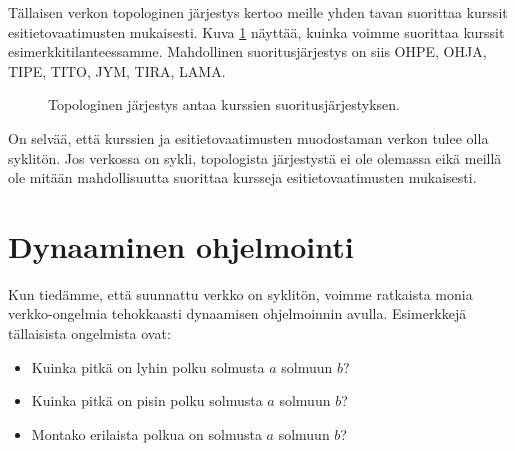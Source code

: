 Tällaisen verkon topologinen järjestys kertoo meille
yhden tavan suorittaa kurssit esitietovaatimusten mukaisesti.
Kuva \ref{fig:kurjar} näyttää, kuinka voimme suorittaa
kurssit esimerkkitilanteessamme.
Mahdollinen suoritusjärjestys on siis
OHPE, OHJA, TIPE, TITO, JYM, TIRA, LAMA.

\begin{figure}
\center
\begin{center}
\end{center}
\caption{Topologinen järjestys antaa kurssien suoritusjärjestyksen.}
\label{fig:kurjar}
\end{figure}

On selvää, että kurssien ja esitietovaatimusten muodostaman
verkon tulee olla syklitön.
Jos verkossa on sykli, topologista järjestystä ei ole olemassa
eikä meillä ole mitään mahdollisuutta suorittaa kursseja
esitietovaatimusten mukaisesti.

\section{Dynaaminen ohjelmointi}

Kun tiedämme, että suunnattu verkko on syklitön,
voimme ratkaista monia verkko-ongelmia tehokkaasti
dynaamisen ohjelmoinnin avulla.
Esimerkkejä tällaisista ongelmista ovat:

\begin{itemize}
\item Kuinka pitkä on lyhin polku solmusta $a$ solmuun $b$?
\item Kuinka pitkä on pisin polku solmusta $a$ solmuun $b$?
\item Montako erilaista polkua on solmusta $a$ solmuun $b$?
\end{itemize}

